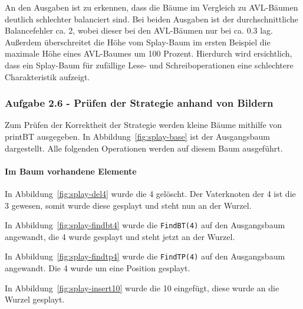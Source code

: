 An den Ausgaben ist zu erkennen, dass die Bäume im Vergleich zu AVL-Bäumen deutlich schlechter
balanciert sind.
Bei beiden Ausgaben ist der durchschnittliche Balancefehler ca. 2, wobei dieser bei den
AVL-Bäumen nur bei ca. 0.3 lag.
Außerdem überschreitet die Höhe vom Splay-Baum im ersten Beispiel die maximale Höhe eines AVL-Baumes
um 100 Prozent.
Hierdurch wird ersichtlich, dass ein Splay-Baum für zufällige Lese- und Schreiboperationen eine
schlechtere Charakteristik aufzeigt.

\subsubsection{Aufgabe 2.6 - Prüfen der Strategie anhand von Bildern}
Zum Prüfen der Korrektheit der Strategie werden kleine Bäume mithilfe von printBT ausgegeben.
In Abbildung~\ref{fig:splay-base} ist der Ausgangsbaum dargestellt.
Alle folgenden Operationen werden auf diesem Baum ausgeführt.

\paragraph{Im Baum vorhandene Elemente}
In Abbildung~\ref{fig:splay-del4} wurde die 4 gelöscht.
Der Vaterknoten der 4 ist die 3 gewesen, somit wurde diese gesplayt und steht nun an der Wurzel.

In Abbildung~\ref{fig:splay-findbt4} wurde die \verb|FindBT(4)| auf den Ausgangsbaum angewandt,
die 4 wurde gesplayt und steht jetzt an der Wurzel.

In Abbildung~\ref{fig:splay-findtp4} wurde die \verb|FindTP(4)| auf den Ausgangsbaum angewandt.
Die 4 wurde um eine Position gesplayt.

In Abbildung~\ref{fig:splay-insert10} wurde die 10 eingefügt, diese wurde an die Wurzel gesplayt.


